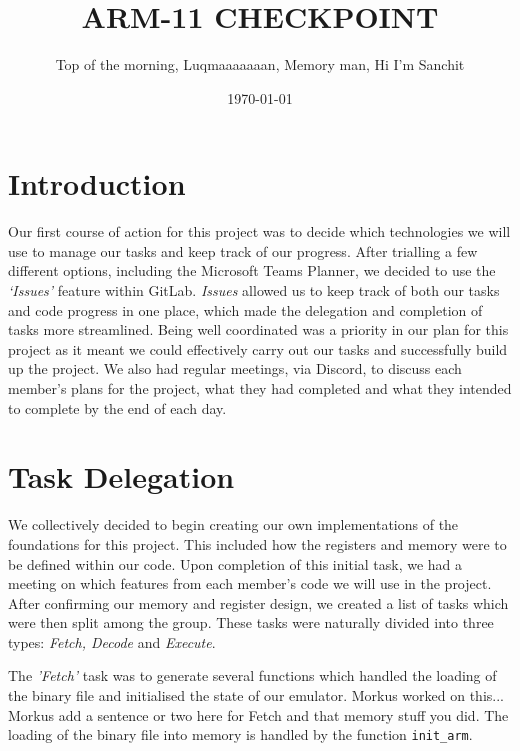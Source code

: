 \documentclass[10pt]{article}
\begin{document}
\title{\vspace{-2cm}ARM-11 CHECKPOINT}

\author{Top of the morning, Luqmaaaaaaan, Memory man, Hi I'm Sanchit}

\date{\today}

\maketitle

\section*{Introduction}
Our first course of action for this project was to decide which technologies we will use to manage our tasks
and keep track of our progress. After trialling a few different options, including the Microsoft Teams Planner,
we decided to use the \textsl{‘Issues’} feature within GitLab. \textsl{Issues} allowed us to keep track of both our tasks and code
progress in one place, which made the delegation and completion of tasks more streamlined. Being well coordinated was a priority in our plan for this project as it meant we could effectively carry out our tasks and successfully build up the project. We also had regular meetings, via Discord, to discuss each member’s plans
for the project, what they had completed and what they intended to complete by the end of each day. 


\section*{Task Delegation}
We collectively decided to begin creating our own implementations of the foundations for this project. This
included how the registers and memory were to be defined within our code. Upon completion of this initial
task, we had a meeting on which features from each member’s code we will use in the project. After
confirming our memory and register design, we created a list of tasks which were then split among the group.
These tasks were naturally divided into three types: \textsl{Fetch, Decode} and \textsl{Execute}.


The \textsl{'Fetch'} task was to generate several functions which handled the loading of the binary file and initialised
the state of our emulator. Morkus worked on this...
Morkus add a sentence or two here for Fetch and that memory stuff you did. 
The loading of the binary file into memory is handled by the function {\tt init\_arm}.
\end{document}
